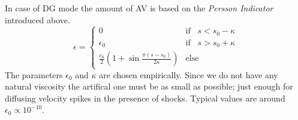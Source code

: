 In case of DG mode the amount of AV is based on the \emph{Persson Indicator}
introduced above.
\begin{equation}
    \epsilon = \begin{cases}
        0 & \text{if}\;\;\; s < s_0 - \kappa \\
        \epsilon_0 & \text{if}\;\;\; s > s_0 + \kappa \\
        \frac{\epsilon_0}{2} \left ( 1 + \sin\frac{\pi(s-s_0)}{2\kappa} \right ) & \text{else}
    \end{cases}
\end{equation}
The parameters $\epsilon_0$ and $\kappa$ are chosen empirically.  Since we do
not have any natural viscosity the artifical one must be as small as possible;
just enough for diffusing velocity spikes in the presence of shocks. Typical
values are around $\epsilon_0 \propto 10^{-10}$.
